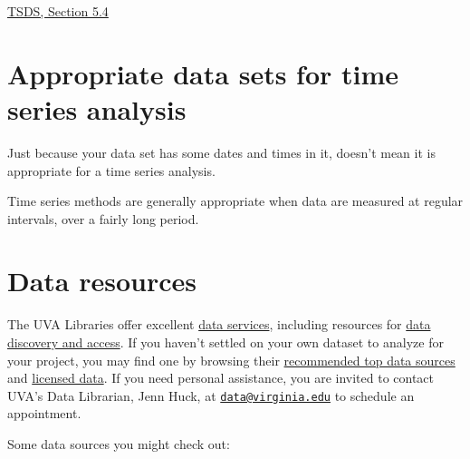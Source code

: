 \documentclass[
]{book}
\begin{document}
\href{https://jhudatascience.org/tidyversecourse/model.html\#data-needs}{TSDS, Section 5.4}

\hypertarget{appropriate-data-sets-for-time-series-analysis}{%
\section{Appropriate data sets for time series analysis}\label{appropriate-data-sets-for-time-series-analysis}}

Just because your data set has some dates and times in it, doesn't mean it is appropriate for a time series analysis.

Time series methods are generally appropriate when data are measured at regular intervals, over a fairly long period.

\hypertarget{data-resources}{%
\section{Data resources}\label{data-resources}}

The UVA Libraries offer excellent \href{https://www.library.virginia.edu/services}{data services}, including resources for \href{https://data.library.virginia.edu/datasources/}{data discovery and access}. If you haven't settled on your own dataset to analyze for your project, you may find one by browsing their \href{https://data.library.virginia.edu/datasources/find-data/}{recommended top data sources} and \href{https://data.library.virginia.edu/datasources/licensed/}{licensed data}. If you need personal assistance, you are invited to contact UVA's Data Librarian, Jenn Huck, at \href{mailto:data@virginia.edu}{\nolinkurl{data@virginia.edu}} to schedule an appointment.

Some data sources you might check out:
\end{document}
